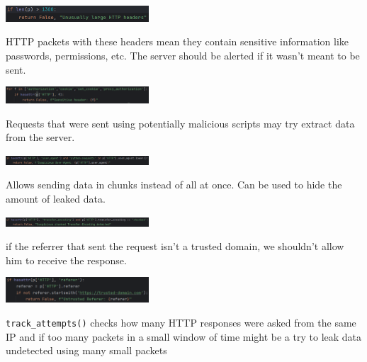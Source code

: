 \documentclass{article}
\begin{document}
\begin{itemize}
    \begin{minipage}{\linewidth}
        \includegraphics[width=0.4\textwidth]{test - http 3.png}
    \end{minipage}
    HTTP packets with these headers mean they contain sensitive information like passwords, permissions, etc. The server should be alerted if it wasn’t meant to be sent. \\
    \begin{minipage}{\linewidth}
        \includegraphics[width=0.4\textwidth]{test - http 4.png}
    \end{minipage}
    Requests that were sent using potentially malicious scripts may try extract data from the server. \\
    \begin{minipage}{\linewidth}
        \includegraphics[width=0.4\textwidth]{test - http 5.png}
    \end{minipage}
    Allows sending data in chunks instead of all at once. Can be used to hide the amount of leaked data. \\
    \begin{minipage}{\linewidth}
        \includegraphics[width=0.4\textwidth]{test - http 6.png}
    \end{minipage}
    if the referrer that sent the request isn’t a trusted domain, we shouldn’t allow him to receive the response. \\
    \begin{minipage}{\linewidth}
        \includegraphics[width=0.4\textwidth]{test - http 7.png}
    \end{minipage}
    \texttt{track\_attempts()} checks how many HTTP responses were asked from the same IP and if too many   packets in a small window of time might be a try to leak data undetected using many small packets \\
    \begin{minipage}{\linewidth}

\end{minipage}
\end{itemize}
\end{document}
